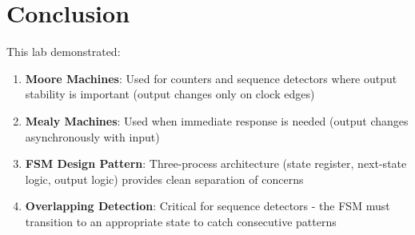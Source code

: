 \documentclass[12pt,a4paper]{article}
\begin{document}
\section{Conclusion}

This lab demonstrated:
\begin{enumerate}
    \item \textbf{Moore Machines}: Used for counters and sequence detectors where output stability is important (output changes only on clock edges)
    \item \textbf{Mealy Machines}: Used when immediate response is needed (output changes asynchronously with input)
    \item \textbf{FSM Design Pattern}: Three-process architecture (state register, next-state logic, output logic) provides clean separation of concerns
    \item \textbf{Overlapping Detection}: Critical for sequence detectors - the FSM must transition to an appropriate state to catch consecutive patterns
\end{enumerate}
\end{document}
